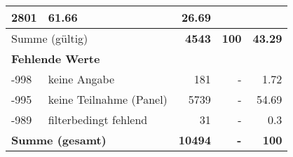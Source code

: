 \begin{longtable}{lXrrr}
       \num{2801} &
       \num[round-mode=places,round-precision=2]{61,66} &
         \num[round-mode=places,round-precision=2]{26,69} \\
     \midrule
     \multicolumn{2}{l}{Summe (gültig)} &
       \textbf{\num{4543}} &
     \textbf{100} &
       \textbf{\num[round-mode=places,round-precision=2]{43,29}} \\
     \multicolumn{5}{l}{\textbf{Fehlende Werte}}\\
       -998 &
       keine Angabe &
         \num{181} &
        - &
         \num[round-mode=places,round-precision=2]{1,72} \\
       -995 &
       keine Teilnahme (Panel) &
         \num{5739} &
        - &
         \num[round-mode=places,round-precision=2]{54,69} \\
       -989 &
       filterbedingt fehlend &
         \num{31} &
        - &
         \num[round-mode=places,round-precision=2]{0,3} \\
     \midrule
     \multicolumn{2}{l}{\textbf{Summe (gesamt)}} &
          \textbf{\num{10494}} &
        \textbf{-} &
        \textbf{100} \\
     \bottomrule
     \end{longtable}
     
